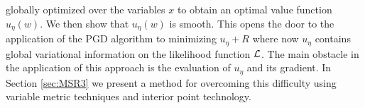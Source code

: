 globally optimized over the variables $x$ to obtain an optimal value function
$u_\eta(w)$. We then show that $u_\eta(w)$ is smooth. This opens
the door to the application of the PGD algorithm to minimizing $u_\eta+R$ 
where now $u_\eta$ contains global variational information
on the likelihood function $\operatorname{\mathcal{L}}$. The main obstacle in the
application of this approach is the evaluation of $u_\eta$ and its gradient.
In Section \ref{sec:MSR3} we present a method for overcoming this difficulty 
using variable metric techniques and interior point technology.


